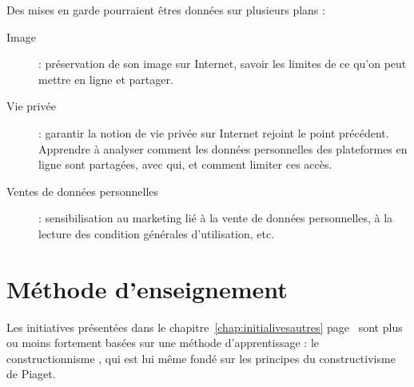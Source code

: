 Des mises en garde pourraient êtres données sur plusieurs plans :

\begin{description}
  \item[Image] : préservation de son image sur Internet, savoir les limites de ce qu'on peut mettre en ligne et partager.
  \item[Vie privée] : garantir la notion de vie privée sur Internet rejoint le point précédent. Apprendre à analyser comment les données personnelles des plateformes en ligne sont partagées, avec qui, et comment limiter ces accès.
  \item[Ventes de données personnelles] : sensibilisation au marketing lié à la vente de données personnelles, à la lecture des condition générales d'utilisation, etc.
\end{description}

\section{Méthode d'enseignement}

Les initiatives présentées dans le chapitre~\ref{chap:initialivesautres} page~\pageref{chap:initialivesautres} sont plus ou moins fortement basées sur une méthode d'apprentissage : le \og constructionnisme \fg{}, qui est lui même fondé sur les principes du constructivisme de Piaget.


